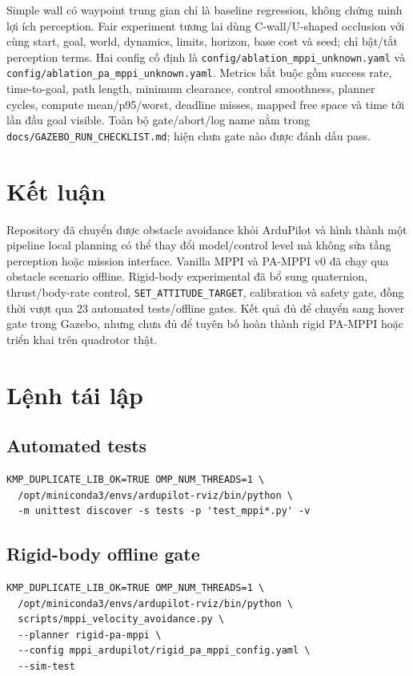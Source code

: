 \documentclass[11pt,a4paper]{article}
\newcommand{\code}[1]{\texttt{#1}}
\begin{document}
Simple wall có waypoint trung gian chỉ là baseline regression, không chứng minh
lợi ích perception. Fair experiment tương lai dùng C-wall/U-shaped occlusion với
cùng start, goal, world, dynamics, limits, horizon, base cost và seed; chỉ bật/tắt
perception terms. Hai config cố định là \code{config/ablation\_mppi\_unknown.yaml}
và \code{config/ablation\_pa\_mppi\_unknown.yaml}. Metrics bắt buộc gồm success
rate, time-to-goal, path length, minimum clearance, control smoothness, planner
cycles, compute mean/p95/worst, deadline misses, mapped free space và time tới
lần đầu goal visible. Toàn bộ gate/abort/log name nằm trong
\code{docs/GAZEBO\_RUN\_CHECKLIST.md}; hiện chưa gate nào được đánh dấu pass.

\section{Kết luận}

Repository đã chuyển được obstacle avoidance khỏi ArduPilot và hình thành một
pipeline local planning có thể thay đổi model/control level mà không sửa tầng
perception hoặc mission interface. Vanilla MPPI và PA-MPPI v0 đã chạy qua
obstacle scenario offline. Rigid-body experimental đã bổ sung quaternion,
thrust/body-rate control, \code{SET\_ATTITUDE\_TARGET}, calibration và safety
gate, đồng thời vượt qua 23 automated tests/offline gates. Kết quả đủ để chuyển
sang hover gate trong Gazebo, nhưng chưa đủ để tuyên
bố hoàn thành rigid PA-MPPI hoặc triển khai trên quadrotor thật.

\appendix
\section{Lệnh tái lập}

\subsection{Automated tests}

\begin{verbatim}
KMP_DUPLICATE_LIB_OK=TRUE OMP_NUM_THREADS=1 \
  /opt/miniconda3/envs/ardupilot-rviz/bin/python \
  -m unittest discover -s tests -p 'test_mppi*.py' -v
\end{verbatim}

\subsection{Rigid-body offline gate}

\begin{verbatim}
KMP_DUPLICATE_LIB_OK=TRUE OMP_NUM_THREADS=1 \
  /opt/miniconda3/envs/ardupilot-rviz/bin/python \
  scripts/mppi_velocity_avoidance.py \
  --planner rigid-pa-mppi \
  --config mppi_ardupilot/rigid_pa_mppi_config.yaml \
  --sim-test
\end{verbatim}
\end{document}
